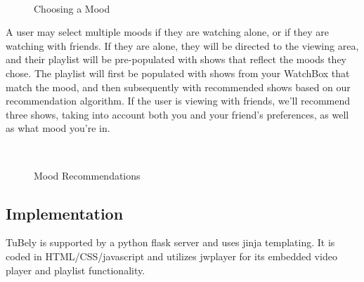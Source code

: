 \begin{figure}
\centering {}
           ~~
\caption{Choosing a Mood}
\label{fig:mood}
\end{figure}

A user may select multiple moods if they are watching alone, or if
they are watching with friends.  If they are alone, they will be
directed to the viewing area, and their playlist will be pre-populated
with shows that reflect the moods they chose.  The playlist will first
be populated with shows from your WatchBox that match the mood, and
then subsequently with recommended shows based on our recommendation
algorithm.  If the user is viewing with friends, we’ll recommend three
shows, taking into account both you and your friend’s preferences, as
well as what mood you’re in.

\begin{figure}
\centering {}
           ~~
\caption{Mood Recommendations}
\label{fig:moodrecommend}
\end{figure}

\subsection{Implementation}
TuBely is supported by a python flask server and uses jinja
templating.  It is coded in HTML/CSS/javascript and utilizes jwplayer
for its embedded video player and playlist functionality.
